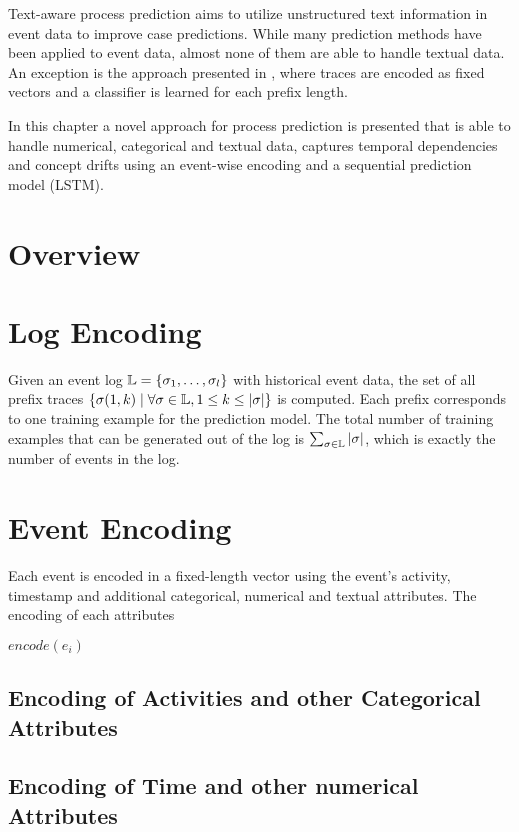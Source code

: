Text-aware process prediction aims to utilize unstructured text information in event data to improve case predictions.
While many prediction methods have been applied to event data, almost none of them are able to handle textual data.
An exception is the approach presented in \cite{DBLP:conf/bpm/TeinemaaDMF16}, where traces are encoded as fixed vectors and a classifier is learned for each prefix length.

In this chapter a novel approach for process prediction is presented that is able to handle numerical, categorical and textual data, captures temporal dependencies and concept drifts using an event-wise encoding and a sequential prediction model (LSTM).

\section{Overview}





\section{Log Encoding}


Given an event log $\mathbb{L} = \{\sigma_1, \dots, \sigma_l\}$ with historical event data, the set of all prefix traces $\{\sigma(1,k) \mid \forall \sigma \in \mathbb{L}, 1 \leq k \leq |\sigma|\}$ is computed.
Each prefix corresponds to one training example for the prediction model.
The total number of training examples that can be generated out of the log is $\sum_{\sigma \in \mathbb{L}}|\sigma|$, which is exactly the number of events in the log.

\section{Event Encoding}

Each event is encoded in a fixed-length vector using the event's activity, timestamp and additional categorical, numerical and textual attributes.
The encoding of each attributes 

$ encode(e_i)$
\subsection{Encoding of Activities and other Categorical Attributes}



\subsection{Encoding of Time and other numerical Attributes}


